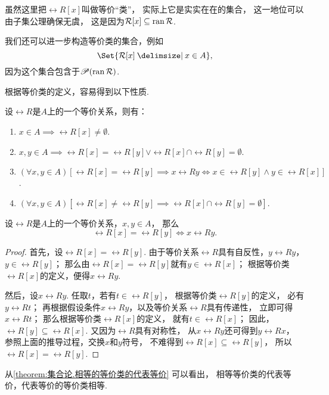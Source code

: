 虽然这里把\(\rel{R}[x]\)叫做等价“类”，
实际上它是实实在在的集合，
这一地位可以由子集公理确保无虞，
这是因为\(\mathcal{R}[x] \subseteq \operatorname{ran} \mathcal{R}\).

我们还可以进一步构造等价类的集合，例如\[
	\Set{ \rel{R}[x] \given x \in A },
\]
因为这个集合包含于\(\mathscr{P}(\operatorname{ran} \mathcal{R})\).

根据等价类的定义，容易得到以下性质.
\begin{property}
设\(\rel{R}\)是\(A\)上的一个等价关系，则有：
\begin{enumerate}
	\item \(x \in A
	\implies \rel{R}[x] \neq \emptyset\).

	\item \(x,y \in A
	\implies \rel{R}[x] = \rel{R}[y]
	\lor \rel{R}[x] \cap \rel{R}[y] = \emptyset\).

	\item \((\forall x,y \in A)
	[
		\rel{R}[x] = \rel{R}[y]
		\implies
		x \rel{R} y
		\iff
		x \in \rel{R}[y] \land y \in \rel{R}[x]
	]\).

	\item \((\forall x,y \in A)
	[
		\rel{R}[x] \neq \rel{R}[y]
		\implies
		\rel{R}[x] \cap \rel{R}[y] = \emptyset
	]\).
\end{enumerate}
\end{property}


\begin{lemma}\label{theorem:集合论.相等的等价类的代表等价}
设\(\rel{R}\)是\(A\)上的一个等价关系，\(x,y \in A\)，
那么\[
	\rel{R}[x] = \rel{R}[y]
	\iff
	x \rel{R} y.
\]
\begin{proof}
首先，设\(\rel{R}[x] = \rel{R}[y]\).
由于等价关系\(\rel{R}\)具有自反性，\(y \rel{R} y\)，\(y \in \rel{R}[y]\)；
那么由\(\rel{R}[x] = \rel{R}[y]\)就有\(y \in \rel{R}[x]\)；
根据等价类\(\rel{R}[x]\)的定义，便得\(x \rel{R} y\).

然后，设\(x \rel{R} y\).
任取\(t\)，若有\(t \in \rel{R}[y]\)，
根据等价类\(\rel{R}[y]\)的定义，
必有\(y \rel{R} t\)；
再根据假设条件\(x \rel{R} y\)，以及等价关系\(\rel{R}\)具有传递性，
立即可得\(x \rel{R} t\)；
那么根据等价类\(\rel{R}[x]\)的定义，
就有\(t \in \rel{R}[x]\)；
因此，\(\rel{R}[y] \subseteq \rel{R}[x]\).
又因为\(\rel{R}\)具有对称性，
从\(x \rel{R} y\)还可得到\(y \rel{R} x\)，
参照上面的推导过程，交换\(x\)和\(y\)符号，
不难得到\(\rel{R}[x] \subseteq \rel{R}[y]\)，
所以\(\rel{R}[x] = \rel{R}[y]\).
\end{proof}
\end{lemma}
从\cref{theorem:集合论.相等的等价类的代表等价} 可以看出，
相等等价类的代表等价，代表等价的等价类相等.

